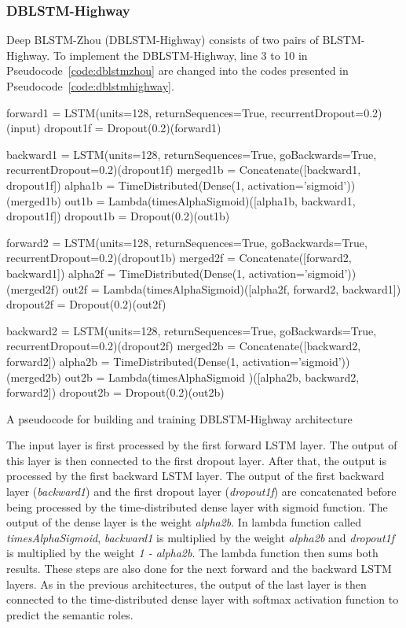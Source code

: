 \subsubsection{DBLSTM-Highway}
Deep BLSTM-Zhou (DBLSTM-Highway) consists of two pairs of BLSTM-Highway. To implement the DBLSTM-Highway, line 3 to 10 in Pseudocode~\ref{code:dblstmzhou} are changed into the codes presented in Pseudocode~\ref{code:dblstmhighway}.

\begin{kode}
		forward1 = LSTM(units=128, returnSequences=True, recurrentDropout=0.2)(input)\;
		dropout1f = Dropout(0.2)(forward1)\;
		\BlankLine
		
		backward1 = LSTM(units=128, returnSequences=True, goBackwards=True, recurrentDropout=0.2)(dropout1f)\;
		merged1b = Concatenate([backward1, dropout1f])\;
		alpha1b = TimeDistributed(Dense(1, activation='sigmoid'))(merged1b)\;
		out1b = Lambda(timesAlphaSigmoid)([alpha1b, backward1, dropout1f])\;
		dropout1b = Dropout(0.2)(out1b)\;
		\BlankLine
		
		forward2 = LSTM(units=128, returnSequences=True, goBackwards=True, recurrentDropout=0.2)(dropout1b)\;
		merged2f = Concatenate([forward2, backward1])\;
		alpha2f = TimeDistributed(Dense(1, activation='sigmoid'))(merged2f)\;
		out2f = Lambda(timesAlphaSigmoid)([alpha2f, forward2, backward1])\;
		dropout2f = Dropout(0.2)(out2f)\;
		\BlankLine
		
		backward2 = LSTM(units=128, returnSequences=True, goBackwards=True, recurrentDropout=0.2)(dropout2f)\;
		merged2b = Concatenate([backward2, forward2])\;
		alpha2b = TimeDistributed(Dense(1, activation='sigmoid'))(merged2b)\;
		out2b = Lambda(timesAlphaSigmoid
		)([alpha2b, backward2, forward2])\;
		dropout2b = Dropout(0.2)(out2b)\;
	
	\caption{A pseudocode for building and training DBLSTM-Highway architecture}
	\label{code:dblstmhighway}
\end{kode}

The input layer is first processed by the first forward LSTM layer. The output of this layer is then connected to the first dropout layer. After that, the output is processed by the first backward LSTM layer. The output of the first backward layer (\textit{backward1}) and the first dropout layer (\textit{dropout1f}) are concatenated before being processed by the time-distributed dense layer with sigmoid function. The output of the dense layer is the weight \textit{alpha2b}. In lambda function called \textit{timesAlphaSigmoid}, \textit{backward1} is multiplied by the weight \textit{alpha2b} and \textit{dropout1f} is multiplied by the weight \textit{1 - alpha2b}. The lambda function then sums both results. These steps are also done for the next forward and the backward LSTM layers. As in the previous architectures, the output of the last layer is then connected to the time-distributed dense layer with softmax activation function to predict the semantic roles.

